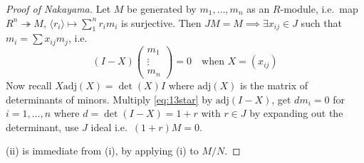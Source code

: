 \documentclass{article}
\begin{document}
\begin{proof}[Proof of Nakayama]
    Let $M$ be generated by $m_1, \dotsc, m_n$ as an $R$-module, i.e.\ map $R^n \twoheadrightarrow M$, $\langle r_i \rangle \mapsto \sum_{1}^n r_i m_i$ is surjective.
    Then $JM = M \implies \exists x_{ij} \in J$ such that $m_i = \sum x_{ij} m_j$, i.e.\
    \begin{equation*}
        (I-X)
        \begin{pmatrix}
            m_1 \\ \vdots \\ m_n
        \end{pmatrix}
        =0 \quad \text{when } X = (x_{ij}) \tag{$*$} \label{eq:13star}
    \end{equation*}
    Now recall $X \text{adj}(X) = \det(X) I$ where $\text{adj}(X)$ is the matrix of determinants of minors.
    Multiply \eqref{eq:13star} by $\text{adj}(I-X)$, get $d m_i = 0$ for $i = 1, \dotsc, n$ where $d = \det(I-X) = 1+r$ with $r \in J$ by expanding out the determinant, use $J$ ideal i.e.\ $(1+r) M = 0$.

    (ii) is immediate from (i), by applying (i) to $M/N$.
\end{proof}
\end{document}
